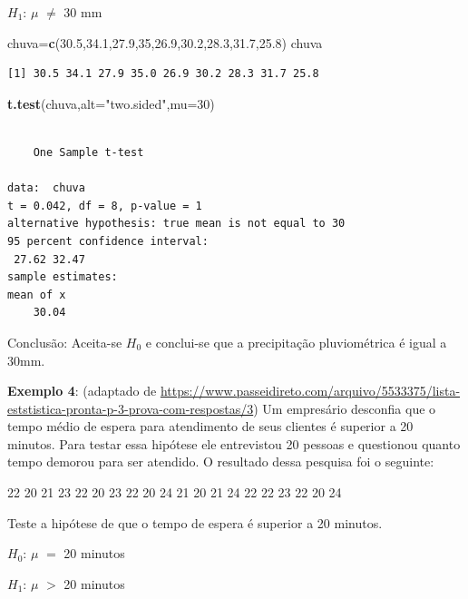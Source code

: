\documentclass[12pt,brazil,oneside]{book}
\newenvironment{Shaded}{\begin{snugshade}}{\end{snugshade}}
\newcommand{\DataTypeTok}[1]{\textcolor[rgb]{0.13,0.29,0.53}{#1}}
\newcommand{\DecValTok}[1]{\textcolor[rgb]{0.00,0.00,0.81}{#1}}
\newcommand{\FloatTok}[1]{\textcolor[rgb]{0.00,0.00,0.81}{#1}}
\newcommand{\KeywordTok}[1]{\textcolor[rgb]{0.13,0.29,0.53}{\textbf{#1}}}
\newcommand{\NormalTok}[1]{#1}
\newcommand{\StringTok}[1]{\textcolor[rgb]{0.31,0.60,0.02}{#1}}
\begin{document}
\textbf{\(H_1\)}: \(\mu\) \(\neq\) 30 mm

\begin{Shaded}
\begin{Highlighting}[]
\NormalTok{chuva=}\KeywordTok{c}\NormalTok{(}\FloatTok{30.5}\NormalTok{,}\FloatTok{34.1}\NormalTok{,}\FloatTok{27.9}\NormalTok{,}\DecValTok{35}\NormalTok{,}\FloatTok{26.9}\NormalTok{,}\FloatTok{30.2}\NormalTok{,}\FloatTok{28.3}\NormalTok{,}\FloatTok{31.7}\NormalTok{,}\FloatTok{25.8}\NormalTok{)}
\NormalTok{chuva}
\end{Highlighting}
\end{Shaded}

\begin{verbatim}
[1] 30.5 34.1 27.9 35.0 26.9 30.2 28.3 31.7 25.8
\end{verbatim}

\begin{Shaded}
\begin{Highlighting}[]
\KeywordTok{t.test}\NormalTok{(chuva,}\DataTypeTok{alt=}\StringTok{"two.sided"}\NormalTok{,}\DataTypeTok{mu=}\DecValTok{30}\NormalTok{)}
\end{Highlighting}
\end{Shaded}

\begin{verbatim}

    One Sample t-test

data:  chuva
t = 0.042, df = 8, p-value = 1
alternative hypothesis: true mean is not equal to 30
95 percent confidence interval:
 27.62 32.47
sample estimates:
mean of x 
    30.04 
\end{verbatim}

Conclusão: Aceita-se \(H_0\) e conclui-se que a precipitação pluviométrica é igual a 30mm.

\textbf{Exemplo 4}: (adaptado de \url{https://www.passeidireto.com/arquivo/5533375/lista-eststistica-pronta-p-3-prova-com-respostas/3}) Um empresário desconfia que o tempo médio de espera para atendimento de seus clientes é superior a 20 minutos. Para testar essa hipótese ele entrevistou 20 pessoas e questionou quanto tempo demorou para ser atendido. O resultado dessa pesquisa foi o seguinte:

22 20 21 23 22 20 23 22 20 24 21 20 21 24 22 22 23 22 20 24

Teste a hipótese de que o tempo de espera é superior a 20 minutos.

\textbf{\(H_0\)}: \(\mu\) \(=\) 20 minutos

\textbf{\(H_1\)}: \(\mu\) \(>\) 20 minutos
\end{document}
